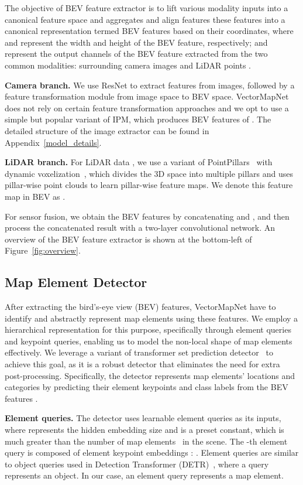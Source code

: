 \documentclass{article}
\theoremstyle{plain}
\theoremstyle{definition}
\theoremstyle{remark}
\begin{document}
The objective of BEV feature extractor is to lift various modality inputs into a canonical feature space and aggregates and align features these features into a canonical representation termed BEV features  based on their coordinates, where  and  represent the width and height of the BEV feature, respectively;  and  represent the output channels of the BEV feature extracted from the two common modalities: surrounding camera images  and LiDAR points . 

\noindent\textbf{Camera branch.}
We use ResNet to extract features from images, followed by a feature transformation module from image space to BEV space. VectorMapNet does not rely on certain feature transformation approaches and we opt to use a simple but popular variant of IPM, which produces BEV features of . The detailed structure of the image extractor can be found in Appendix~\ref{model_details}.

\noindent\textbf{LiDAR branch.}
For LiDAR data , we use a variant of PointPillars~\citep{lang2019pointpillars} with dynamic voxelization~\citep{zhou2020end}, which divides the 3D space into multiple pillars and uses pillar-wise point clouds to learn pillar-wise feature maps.  We denote this feature map in BEV as . 

For sensor fusion, we obtain the BEV features   by concatenating  and , and then process the concatenated result with a two-layer convolutional network. 
An overview of the BEV feature extractor is shown at the bottom-left of Figure~\ref{fig:overview}. 


\subsection{Map Element Detector}
\label{sec:det}
After extracting the bird's-eye view (BEV) features, VectorMapNet have to identify and abstractly represent map elements using these features. We employ a hierarchical representation for this purpose, specifically through element queries and keypoint queries, enabling us to model the non-local shape of map elements effectively. We leverage a variant of transformer set prediction detector~\citep{carion2020end} to achieve this goal, as it is a robust detector that eliminates the need for extra post-processing. Specifically, the detector represents map elements' locations and categories by predicting their element keypoints  and class labels  from the BEV features . 

\noindent\textbf{Element queries.}
The detector uses learnable element queries  as its inputs, where  represents the hidden embedding size and  is a preset constant, which is much greater than the number of map elements~ in the scene. The -th element query  is composed of  element keypoint embeddings : .
Element queries are similar to object queries used in Detection Transformer (DETR)~\citep{carion2020end}, where a query represents an object. In our case, an element query represents a map element.
\end{document}
